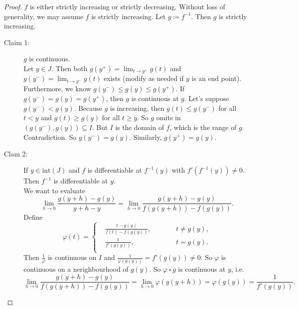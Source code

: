 \documentclass[12pt]{article}
\theoremstyle{plain}
\theoremstyle{definition}
\begin{document}
\begin{proof}
    $f$ is either strictly increasing or strictly decreasing.
    Without loss of generality, we may assume $f$ is strictly increasing.
    Let $g\coloneqq f^{-1}$.
    Then $g$ is strictly increasing.
    \begin{description}
        \item[Claim 1:] $g$ is continuous.\\
            Let $y\in J$.
            Then both $g(y^+) = \lim_{t\rightarrow y^+}g(t)$ and $g(y^-) = \lim_{t\rightarrow y^-}g(t)$ exists (modify as
            needed if $y$ is an end point).
            Furthermore, we know $g(y^-) \leq g(y) \leq g(y^+)$.
            If $g(y^-) = g(y) = g(y^+)$, then $g$ is continuous at $g$.
            Let's suppose $g(y^-) < g(y)$.
            Because $g$ is increasing, then $g(t)\leq g(y^-)$ for all $t<y$ and $g(t)\geq g(y)$ for all $t\geq y$.
            So $g$ omits in $(g(y^-),g(y))\subseteq I$.
            But $I$ is the domain of $f$, which is the range of $g$.
            Contradiction.
            So $g(y^-)=g(y)$. Similarly, $g(y^+) = g(y)$.
        \item[Clam 2:] If $y\in \text{int}(J)$ and $f$ is differentiable at $f^{-1}(y)$ with $f'(f^{-1}(y))\neq0$.
            Then $f^{-1}$ is differentiable at $y$.\\
            We want to evaluate
            \[\lim_{h\rightarrow 0}\frac{g(y+h)-g(y)}{y+h-y} = \lim_{h\rightarrow0}\frac{g(y+h)-g(y)}{f(g(y+h)) -
            f(g(y))}.\]
            Define 
            \[\varphi(t)=\left\{
                    \begin{aligned}
                        &\frac{t-g(y)}{f(t)-f(g(y))},\qquad&& t\neq g(y),\\
                        &\frac{1}{f'(g(y))},&& t=g(y).\\
                    \end{aligned}
            \right.\]
            Then $\frac{1}{\varphi}$ is continuous on $I$ and $\frac{1}{\varphi(g(y))} = f'(g(y))\neq 0$. 
            So $\varphi$ is continuous on a nerighbourhood of $g(y)$.
            So $\varphi\circ g$ is continuous at $y$, i.e.
            \[\lim_{h\rightarrow0}\frac{g(y+h)-g(y)}{f(g(y+h)) - f(g(y))} = \lim_{h\rightarrow 0}\varphi(g(y+h)) = \varphi(g(y)) = \frac{1}{f'(g(y))}.\]
    \end{description}
\end{proof}
\end{document}
